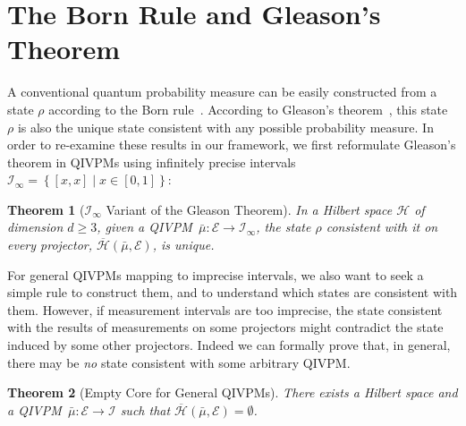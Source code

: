 \documentclass[english,reprint, aps, prl,superscriptaddress, showpacs,
showkeys, longbibliography, amsmath, amssymb, floatfix]{revtex4-1}
\theoremstyle{plain}
\newtheorem{thm}{Theorem}
\theoremstyle{definition}
\newcommand{\Hilb}{\mathcal{H}}
\newcommand{\events}{\ensuremath{\mathcal{E}}}
\newcommand{\amr}[1]{\begin{framed}\begin{minipage}{0.9\linewidth}\color{green}{Amr says: #1}\end{minipage}\end{framed}}
\newcommand{\set}[2]{\ensuremath{\left\{ {#1}\mathrel{}\middle|\mathrel{}{#2}\right\} }}
\newcommand{\coreBorn}{\ensuremath{\overline{\Hilb}}}
\begin{document}
\section{The Born Rule and Gleason's Theorem}

\label{sec:Gleason}

A conventional quantum probability measure can be easily constructed
from a state $\rho$ according to the Born
rule~\citep{Born1983,Mermin2007,Jaeger2007}.  According
to Gleason's
theorem~\citep{gleason1957,Redhead1987-REDINA,peres1995quantum}, this
state $\rho$ is also the unique state consistent with any possible
probability measure. In order to re-examine these results in our
framework, we first reformulate Gleason's theorem in QIVPMs using
infinitely precise
intervals~$\mathscr{I}_{\infty}=\set{\left[x,x\right]}{x\in\left[0,1\right]}$:

\begin{thm}[$\mathscr{I}_{\infty}$ Variant of the Gleason
  Theorem]\label{cor:Gleason's}In
  a Hilbert space $\Hilb$ of dimension $d\geq3$, given a
  QIVPM~$\bar{\mu}:\events\rightarrow\mathscr{I}_{\infty}$, the state
  $\rho$ consistent with it on every projector,
  $\coreBorn\left(\bar{\mu},\events\right)$, is unique. \end{thm}

\amr{Rewrite next sentence. Thm 4 assumes infinite
  precision. Question: what happens with finite precision
  intervals. Two thoughts: (1) multiple states will match the
  probab. distribution, (2) for small collections of projectors
  different states will agree with observations; if one looks at all
  projectors it may be the case that no state agrees with all.}

\noindent For general QIVPMs mapping to imprecise intervals, we also
want to seek a simple rule to construct them, and to understand which
states are consistent with them. However, if measurement intervals are
too imprecise, the state consistent with the results of measurements
on some projectors might contradict the state induced by some other
projectors. Indeed we can formally prove that, in general, there may
be \emph{no} state consistent with some arbitrary QIVPM.

\begin{thm}[Empty Core for General
  QIVPMs]\label{thm:Non-extensible-of-Gleason's}There exists a Hilbert
  space and a QIVPM~$\bar{\mu}:\events\rightarrow\mathscr{I}$ such
  that $\coreBorn\left(\bar{\mu},\events\right)=\emptyset$.\end{thm}
\end{document}
